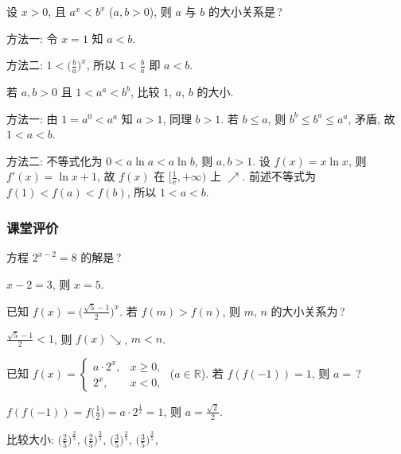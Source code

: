   \lianxi
  \begin{exercise}
    设 $x>0$, 且 $a^x <b^x$ ($a, b>0$), 则 $a$ 与 $b$ 的大小关系是\,?
  \end{exercise}

  \beginsolution
    方法一: 令 $x=1$ 知 $a<b$.
    
    方法二: $1<\Big(\frac{b}a\Big)^x$, 所以 $1<\frac{b}a$ 即 $a<b$.
    
    \varexercise 若 $a,b>0$ 且 $1<a^a<b^b$, 比较 $1$, $a$, $b$ 的大小.
    
    方法一: 由 $1=a^0<a^a$ 知 $a>1$, 同理 $b>1$. 若 $b\leqslant a$, 则 $b^b\leqslant b^a\leqslant a^a$, 矛盾, 故 $1<a<b$.
    
    方法二: 不等式化为 $0< a\ln a< a\ln b$, 则 $a,b>1$. 设 $f(x)=x\ln x$, 则 $f'(x)=\ln x+1$, 故 $f(x)$ 在 $\Big[\frac1{\mathrm{e}},+\infty\Big)$ 上 $\nearrow$. 前述不等式为 $f(1)<f(a)<f(b)$, 所以 $1<a<b$.
  \endsolution
  
  \subsubsection{课堂评价}
  \begin{exercise}
    方程 $2^{x-2} =8$ 的解是\,?
  \end{exercise}

  \beginsolution
    $x-2=3$, 则 $x=5$.
  \endsolution
  
  \begin{exercise}
    已知 $f(x)=\Big(\frac{\sqrt5-1}2\Big)^x$. 
    若 $f(m)>f(n)$, 则 $m$, $n$ 的大小关系为\,?
  \end{exercise}

  \beginsolution
    $\frac{\sqrt5-1}2<1$, 则 $f(x)\searrow$, $m<n$.
  \endsolution
  
  \begin{exercise}
    已知 $f(x)=\begin{cases}
      a\cdot 2^x, & x\geqslant 0,\\
      2^x, & x<0, \end{cases}$ ($a\in\mathbb{R}$).
    若 $f(f(-1))=1$, 则 $a=$\,?
  \end{exercise}

  \beginsolution
    $f(f(-1))=f\Big(\frac12\Big)=a\cdot 2^{\frac12}=1$, 则 $a=\frac{\sqrt2}2$.
  \endsolution
  
  \begin{exercise}
    比较大小: $\Big(\frac25\Big)^{\frac25}$,  $\Big(\frac25\Big)^{\frac35}$, $\Big(\frac35\Big)^{\frac25}$, $\Big(\frac35\Big)^{\frac35}$,
  \end{exercise}

